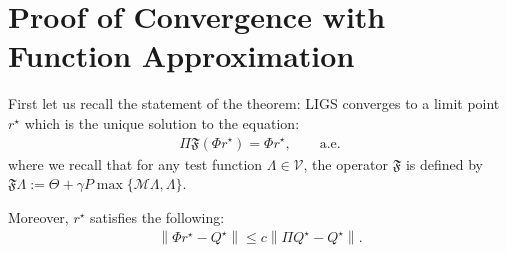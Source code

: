 \documentclass{article}
\newenvironment{customthm}[1]
  {\renewcommand\theinnercustomthm{#1}\innercustomthm}
  {\endinnercustomthm}
\begin{document}
\section*{Proof of Convergence with Function Approximation}
First let us recall the statement of the theorem:
\begin{customthm}{3}
LIGS converges to a limit point $r^\star$ which is the unique solution to the equation:
\begin{align}
\Pi \mathfrak{F} (\Phi r^\star)=\Phi r^\star, \qquad \text{a.e.}
\end{align}
where we recall that for any test function $\Lambda \in \mathcal{V}$, the operator $\mathfrak{F}$ is defined by $
    \mathfrak{F}\Lambda:=\Theta+\gamma P \max\{\mathcal{M}\Lambda,\Lambda\}$.

Moreover, $r^\star$ satisfies the following:
\begin{align}
    \left\|\Phi r^\star - Q^\star\right\|\leq c\left\|\Pi Q^\star-Q^\star\right\|.
\end{align}
\end{customthm}
\end{document}
